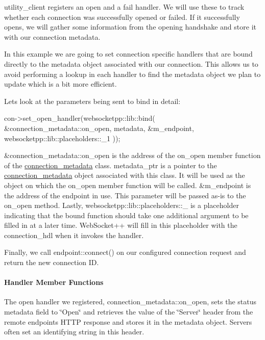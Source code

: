 {\ttfamily utility\+\_\+client} registers an open and a fail handler. We will use these to track whether each connection was successfully opened or failed. If it successfully opens, we will gather some information from the opening handshake and store it with our connection metadata.

In this example we are going to set connection specific handlers that are bound directly to the metadata object associated with our connection. This allows us to avoid performing a lookup in each handler to find the metadata object we plan to update which is a bit more efficient.

Lets look at the parameters being sent to bind in detail\+:


\begin{DoxyCode}
con->set\_open\_handler(websocketpp::lib::bind(
    &connection\_metadata::on\_open,
    metadata,
    &m\_endpoint,
    websocketpp::lib::placeholders::\_1
));
\end{DoxyCode}


{\ttfamily \&connection\+\_\+metadata\+::on\+\_\+open} is the address of the {\ttfamily on\+\_\+open} member function of the {\ttfamily \mbox{\hyperlink{classconnection__metadata}{connection\+\_\+metadata}}} class. {\ttfamily metadata\+\_\+ptr} is a pointer to the {\ttfamily \mbox{\hyperlink{classconnection__metadata}{connection\+\_\+metadata}}} object associated with this class. It will be used as the object on which the {\ttfamily on\+\_\+open} member function will be called. {\ttfamily \&m\+\_\+endpoint} is the address of the endpoint in use. This parameter will be passed as-\/is to the {\ttfamily on\+\_\+open} method. Lastly, {\ttfamily websocketpp\+::lib\+::placeholders\+::\+\_} is a placeholder indicating that the bound function should take one additional argument to be filled in at a later time. Web\+Socket++ will fill in this placeholder with the {\ttfamily connection\+\_\+hdl} when it invokes the handler.

Finally, we call {\ttfamily endpoint\+::connect()} on our configured connection request and return the new connection ID.

\paragraph*{Handler Member Functions}

The open handler we registered, {\ttfamily connection\+\_\+metadata\+::on\+\_\+open}, sets the status metadata field to \char`\"{}\+Open\char`\"{} and retrieves the value of the \char`\"{}\+Server\char`\"{} header from the remote endpoint\textquotesingle{}s H\+T\+TP response and stores it in the metadata object. Servers often set an identifying string in this header.

